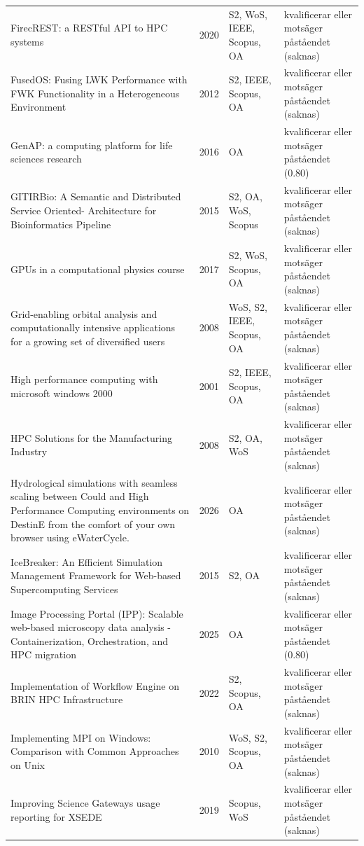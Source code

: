 \begin{longtable}{@{}%
  >{\raggedright\arraybackslash}p{}c%
  >{\raggedright\arraybackslash}p{}%
  >{\raggedright\arraybackslash}p{}@{}}
FirecREST: a RESTful API to HPC systems & 2020 & S2, WoS, IEEE, Scopus, OA & kvalificerar eller motsäger påståendet (saknas) \\
FusedOS: Fusing LWK Performance with FWK Functionality in a Heterogeneous Environment & 2012 & S2, IEEE, Scopus, OA & kvalificerar eller motsäger påståendet (saknas) \\
GenAP: a computing platform for life sciences research & 2016 & OA & kvalificerar eller motsäger påståendet (0.80) \\
GITIRBio: A Semantic and Distributed Service Oriented- Architecture for Bioinformatics Pipeline & 2015 & S2, OA, WoS, Scopus & kvalificerar eller motsäger påståendet (saknas) \\
GPUs in a computational physics course & 2017 & S2, WoS, Scopus, OA & kvalificerar eller motsäger påståendet (saknas) \\
Grid-enabling orbital analysis and computationally intensive applications for a growing set of diversified users & 2008 & WoS, S2, IEEE, Scopus, OA & kvalificerar eller motsäger påståendet (saknas) \\
High performance computing with microsoft windows 2000 & 2001 & S2, IEEE, Scopus, OA & kvalificerar eller motsäger påståendet (saknas) \\
HPC Solutions for the Manufacturing Industry & 2008 & S2, OA, WoS & kvalificerar eller motsäger påståendet (saknas) \\
Hydrological simulations with seamless scaling between Could and High Performance Computing environments on DestinE from the comfort of your own browser using eWaterCycle. & 2026 & OA & kvalificerar eller motsäger påståendet (saknas) \\
IceBreaker: An Efficient Simulation Management Framework for Web-based Supercomputing Services & 2015 & S2, OA & kvalificerar eller motsäger påståendet (saknas) \\
Image Processing Portal (IPP): Scalable web-based microscopy data analysis - Containerization, Orchestration, and HPC migration & 2025 & OA & kvalificerar eller motsäger påståendet (0.80) \\
Implementation of Workflow Engine on BRIN HPC Infrastructure & 2022 & S2, Scopus, OA & kvalificerar eller motsäger påståendet (saknas) \\
Implementing MPI on Windows: Comparison with Common Approaches on Unix & 2010 & WoS, S2, Scopus, OA & kvalificerar eller motsäger påståendet (saknas) \\
Improving Science Gateways usage reporting for XSEDE & 2019 & Scopus, WoS & kvalificerar eller motsäger påståendet (saknas) \\

\end{longtable}
